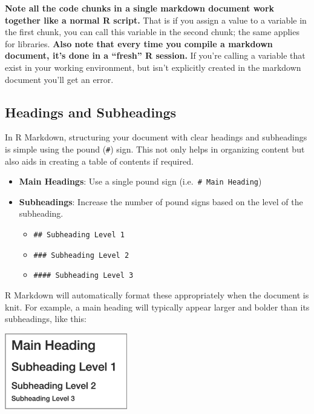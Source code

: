 \documentclass[
]{book}
\providecommand{\tightlist}{%
  \setlength{\itemsep}{0pt}\setlength{\parskip}{0pt}}
\begin{document}
\textbf{Note all the code chunks in a single markdown document work together like a normal R script.} That is if you assign a value to a variable in the first chunk, you can call this variable in the second chunk; the same applies for libraries. \textbf{Also note that every time you compile a markdown document, it's done in a ``fresh'' R session.} If you're calling a variable that exist in your working environment, but isn't explicitly created in the markdown document you'll get an error.

\hypertarget{headings-and-subheadings}{%
\subsection{Headings and Subheadings}\label{headings-and-subheadings}}

In R Markdown, structuring your document with clear headings and subheadings is simple using the pound (\texttt{\#}) sign. This not only helps in organizing content but also aids in creating a table of contents if required.

\begin{itemize}
\tightlist
\item
  \textbf{Main Headings}: Use a single pound sign (i.e.~\texttt{\#\ Main\ Heading})
\item
  \textbf{Subheadings}: Increase the number of pound signs based on the level of the subheading.

  \begin{itemize}
  \tightlist
  \item
    \texttt{\#\#\ Subheading\ Level\ 1}
  \item
    \texttt{\#\#\#\ Subheading\ Level\ 2}
  \item
    \texttt{\#\#\#\#\ Subheading\ Level\ 3}
  \end{itemize}
\end{itemize}

R Markdown will automatically format these appropriately when the document is knit. For example, a main heading will typically appear larger and bolder than its subheadings, like this:

\includegraphics[width=0.4\textwidth,height=\textheight]{images/heading_example.PNG}
\end{document}
